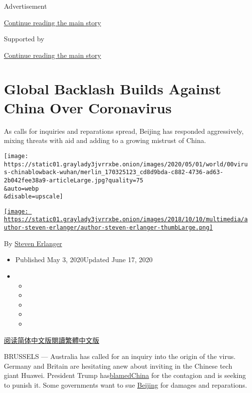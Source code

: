 Advertisement

\protect\hyperlink{after-top}{Continue reading the main story}

Supported by

\protect\hyperlink{after-sponsor}{Continue reading the main story}

\hypertarget{global-backlash-builds-against-china-over-coronavirus}{%
\section{Global Backlash Builds Against China Over
Coronavirus}\label{global-backlash-builds-against-china-over-coronavirus}}

As calls for inquiries and reparations spread, Beijing has responded
aggressively, mixing threats with aid and adding to a growing mistrust
of China.

\texttt{[image: https://static01.graylady3jvrrxbe.onion/images/2020/05/01/world/00virus-chinablowback-wuhan/merlin\_170325123\_cd8d9bda-c882-4736-ad63-2b042fee38a9-articleLarge.jpg?quality=75\\\&auto=webp\\\&disable=upscale]}

\href{https://www.nytimes3xbfgragh.onion/by/steven-erlanger}{\texttt{[image: https://static01.graylady3jvrrxbe.onion/images/2018/10/10/multimedia/author-steven-erlanger/author-steven-erlanger-thumbLarge.png]}}

By \href{https://www.nytimes3xbfgragh.onion/by/steven-erlanger}{Steven
Erlanger}

\begin{itemize}
\item
  Published May 3, 2020Updated June 17, 2020
\item
  \begin{itemize}
  \item
  \item
  \item
  \item
  \item
  \end{itemize}
\end{itemize}

\href{https://cn.nytimes3xbfgragh.onion/world/20200506/backlash-china-coronavirus/}{阅读简体中文版}\href{https://cn.nytimes3xbfgragh.onion/world/20200506/backlash-china-coronavirus/zh-hant/}{閱讀繁體中文版}

BRUSSELS --- Australia has called for an inquiry into the origin of the
virus. Germany and Britain are hesitating anew about inviting in the
Chinese tech giant Huawei. President Trump
has\href{https://www.nytimes3xbfgragh.onion/2020/04/30/us/politics/trump-administration-intelligence-coronavirus-china.html?action=click\&module=Spotlight\&pgtype=Homepage}{blamed}\href{https://www.nytimes3xbfgragh.onion/2020/05/21/business/economy/coronavirus-china-economy.html}{China}
for the contagion and is seeking to punish it. Some governments want to
sue
\href{https://www.nytimes3xbfgragh.onion/2020/06/19/world/asia/coronavirus-china-beijing.html}{Beijing}
for damages and reparations.

